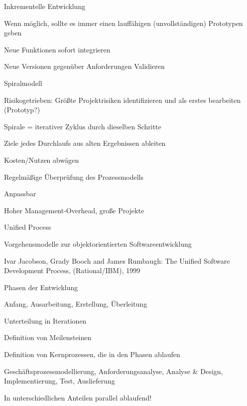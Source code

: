 \documentclass[a4paper]{article}
\begin{document}
\begin{multicols}{3}
  Inkrementelle Entwicklung
  \begin{itemize*}
    \item Wenn möglich, sollte es immer einen lauffähigen (unvollständigen) Prototypen geben
    \item Neue Funktionen sofort integrieren
    \item Neue Versionen gegenüber Anforderungen Validieren
  \end{itemize*}

  Spiralmodell
  \begin{itemize*}
    \item Risikogetrieben: Größte Projektrisiken identifizieren und als erstes bearbeiten (Prototyp?)
    \item Spirale = iterativer Zyklus durch dieselben Schritte
    \item Ziele jedes Durchlaufs aus alten Ergebnissen ableiten
    \item Kosten/Nutzen abwägen
    \item Regelmäßige Überprüfung des Prozessmodells
    \item Anpassbar
    \item Hoher Management-Overhead, große Projekte
  \end{itemize*}

  Unified Process
  \begin{itemize*}
    \item Vorgehensmodelle zur objektorientierten Softwareentwicklung
    \begin{itemize*}
      \item Ivar Jacobson, Grady Booch and James Rumbaugh: The Unified Software Development Process, (Rational/IBM), 1999
    \end{itemize*}
    \item Phasen der Entwicklung
    \begin{itemize*}
      \item Anfang, Ausarbeitung, Erstellung, Überleitung
      \item Unterteilung in Iterationen
      \item Definition von Meilensteinen
    \end{itemize*}
    \item Definition von Kernprozessen, die in den Phasen ablaufen
    \begin{itemize*}
      \item Geschäftsprozessmodellierung, Anforderungsanalyse, Analyse \& Design, Implementierung, Test, Auslieferung
      \item In unterschiedlichen Anteilen parallel ablaufend!
    \end{itemize*}
  \end{itemize*}


\end{multicols}
\end{document}
